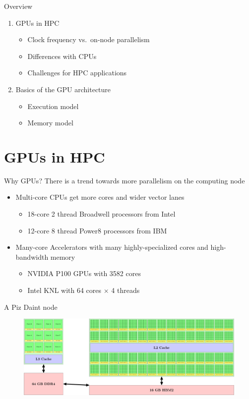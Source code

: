 \documentclass[aspectratio=169,12pt]{beamer}
\begin{document}
\begin{frame}{Overview}
  \begin{enumerate}
  \item GPUs in HPC
    \begin{itemize}
    \item Clock frequency vs.\ on-node parallelism
    \item Differences with CPUs
    \item Challenges for HPC applications
    \end{itemize}
    \vspace\baselineskip
  \item Basics of the GPU architecture
    \begin{itemize}
    \item Execution model
    \item Memory model
    \end{itemize}
  \end{enumerate}
\end{frame}

\part{GPUs in HPC}

\begin{frame}{Why GPUs?}
  There is a trend towards more parallelism on the computing node
  \vfill
  \begin{itemize}
    \item Multi-core CPUs get more cores and wider vector lanes
      \begin{itemize}
      \item 18-core 2 thread Broadwell processors from Intel
      \item 12-core 8 thread Power8 processors from IBM
      \end{itemize}
      \vfill
    \item Many-core Accelerators with many highly-specialized cores and high-bandwidth memory
      \begin{itemize}
      \item NVIDIA P100 GPUs with 3582 cores
      \item Intel KNL with 64 cores $\times$ 4 threads
      \end{itemize}
  \end{itemize}
\end{frame}

\begin{frame}{A Piz Daint node}
  \begin{figure}
    \centering
    \includegraphics[width=\textwidth]{pizdaint_node}
  \end{figure}
\end{frame}
\end{document}
